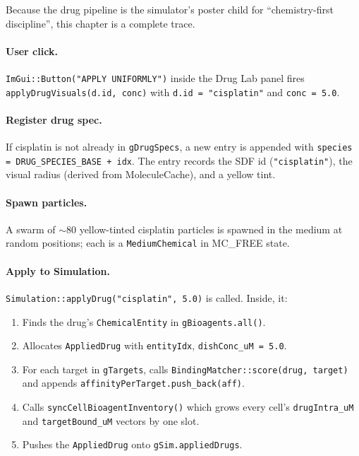 \documentclass[11pt,letterpaper,twoside,openany]{book}
\newcommand{\code}[1]{\texttt{#1}}
\begin{document}
Because the drug pipeline is the simulator's poster child for
``chemistry-first discipline'', this chapter is a complete trace.

\paragraph{User click.} \code{ImGui::Button("APPLY UNIFORMLY")}
inside the Drug Lab panel fires \code{applyDrugVisuals(d.id, conc)}
with \code{d.id = "cisplatin"} and \code{conc = 5.0}.

\paragraph{Register drug spec.} If cisplatin is not already in
\code{gDrugSpecs}, a new entry is appended with
\code{species = DRUG\_SPECIES\_BASE + idx}. The entry records the
SDF id (\code{"cisplatin"}), the visual radius (derived from
MoleculeCache), and a yellow tint.

\paragraph{Spawn particles.} A swarm of $\sim$80 yellow-tinted
cisplatin particles is spawned in the medium at random positions;
each is a \code{MediumChemical} in MC\_FREE state.

\paragraph{Apply to Simulation.} \code{Simulation::applyDrug("cisplatin", 5.0)}
is called. Inside, it:
\begin{enumerate}
  \item Finds the drug's \code{ChemicalEntity} in
        \code{gBioagents.all()}.
  \item Allocates \code{AppliedDrug} with \code{entityIdx}, \code{dishConc\_uM = 5.0}.
  \item For each target in \code{gTargets}, calls
        \code{BindingMatcher::score(drug, target)} and appends
        \code{affinityPerTarget.push\_back(aff)}.
  \item Calls \code{syncCellBioagentInventory()} which grows every
        cell's \code{drugIntra\_uM} and \code{targetBound\_uM}
        vectors by one slot.
  \item Pushes the \code{AppliedDrug} onto
        \code{gSim.appliedDrugs}.
\end{enumerate}
\end{document}
